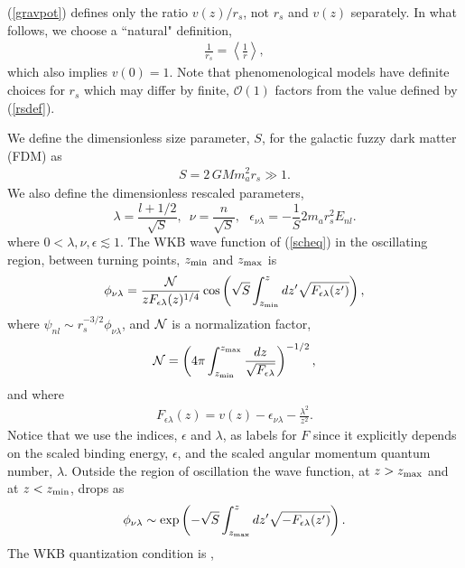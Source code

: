 \documentclass[aps,prl,twocolumn]{revtex4}
\begin{document}
 (\ref{gravpot}) defines only the ratio $v(z)/r_s$, not $r_s$ and $v(z)$ separately.  In what follows, we choose a ``natural" definition,
\begin{align}\label{rsdef}
\frac{1}{r_s} = \left\langle \frac{1}{r} \right\rangle,
\end{align}
which also implies $v(0) = 1$.  Note that phenomenological models have definite choices for $r_s$ which may differ by finite, $\mathcal{O}(1)$ factors from the value defined by (\ref{rsdef}). 

We define the dimensionless size parameter, $S$, for the galactic fuzzy dark matter (FDM) as
\begin{align*}
    S=2\, G M m_a^2 r_s \gg 1.
\end{align*}
We also define the dimensionless rescaled parameters,
\begin{equation*}
   \lambda=\frac{l+1/2}{\sqrt{S}},\,\,\,\nu=\frac{n}{\sqrt{S}},\,\,\,\, \epsilon_{\nu\lambda}=-\frac{1}{S}2m_a r_s^2 E_{nl}.
\end{equation*}
where $0<\lambda,\nu,\epsilon \lesssim 1$.
The WKB wave function of (\ref{scheq}) in the oscillating region, between turning points, $z_{\rm min}$ and $z_{\rm max}$ is
\begin{align}\label{wave}
    \phi_{\nu\lambda}=\frac{\cal{N}}{z F_{\epsilon\lambda} (z)^{1/4}}\cos\left(\sqrt{S}\int_{z_{\rm min}}^z dz'\sqrt{F_{\epsilon\lambda}(z')}\right),
\end{align}
where $\psi_{nl}\sim r_s^{-3/2}\phi_{\nu \lambda}$, and ${\cal N}$ is a normalization factor,
\begin{align*}
    {\cal{N}}=\left(4\pi \int_{z_{\rm min}}^{z_{\rm max}}\frac{ dz}{\sqrt{F_{\epsilon\lambda}}}\right)^{-1/2},
\end{align*}
and where
\begin{align*}
    F_{\epsilon\lambda}(z)=v(z)-\epsilon_{\nu\lambda}-\frac{\lambda^2}{z^2}.
\end{align*}
Notice that we use the indices, $\epsilon$ and $\lambda$, as  labels for $F$ since it explicitly depends on the scaled binding energy, $\epsilon$, and the scaled angular momentum quantum number, $\lambda$. Outside the region of oscillation the wave function, at $z>z_{\rm max}$ and at $z<z_{\rm min}$, drops as
\begin{align}\label{waveexp}
    \phi_{\nu\lambda}\sim \exp\left(-\sqrt{S}\int_{z_{\rm max}}^z dz'\sqrt{-F_{\epsilon\lambda}(z')}\right).
\end{align}The WKB quantization condition is \cite{Langer,Sergeenk0_1996},
\end{document}
